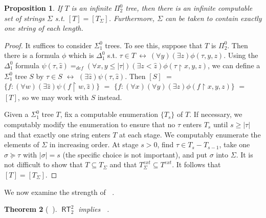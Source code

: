 \documentclass{amsart}
\theoremstyle{plain}
\newtheorem{theorem}{Theorem}
\newtheorem{prop}[theorem]{Proposition}
\theoremstyle{remark}
\theoremstyle{definition}
\DeclareMathOperator{\RCA}{\mathsf{RCA}_0}
\DeclareMathOperator{\RT}{\mathsf{RT}}
\DeclareMathOperator{\RKLp}{\mathsf{RKL}^{(1)}}
\begin{document}
\begin{prop}
\label{lemma.pi2-trees}
If $T$ is an infinite $\Pi^0_2$ tree, then there is an infinite computable set of strings $\Sigma$ s.t. $[T]=[T_{\Sigma}]$. 
Furthermore, $\Sigma$ can be taken to contain exactly one string of each length.
\end{prop}
\begin{proof}
It suffices to consider $\Sigma^0_1$ trees.
To see this, suppose that $T$ is $\Pi^0_2$.  Then there is a formula $\phi$ which is $\Delta^0_1$ s.t. $\tau\in T\ \leftrightarrow\ (\forall y)(\exists z)\phi(\tau,y,z)$.
	Using the $\Delta^0_1$ formula $\psi(\tau, \hat{z}) =_{def} (\forall x,y\leq |\tau|)(\exists z<\hat{z})\phi(\tau\upharpoonright x,y,z)$, 
we can define a $\Sigma^0_1$ tree $S$ by $\tau\in S$ $\leftrightarrow$ $(\exists \hat{z}) \psi(\tau,\hat{z})$.
Then $[S]$ $=$ $\{f: (\forall w)(\exists \hat{z})\psi(f\upharpoonright w,\hat{z}) \}$ 
$=$ $\{f: (\forall x)(\forall y)(\exists z)\phi(f\upharpoonright x,y,z) \}$
$=$ $[T]$, so we may work with $S$ instead.

Given a $\Sigma^0_1$ tree $T$, fix a computable enumeration $\{T_s\}$ of $T$.  
If necessary, we computably modify the enumeration to ensure that 
	no $\tau$ enters $T_s$ until $s\geq |\tau|$ and that
	exactly one string enters $T$ at each stage.
We computably enumerate the elements of $\Sigma$ in increasing order. 
At stage $s>0$, find $\tau\in T_s-T_{s-1}$, take one $\sigma\succeq\tau$ with $|\sigma|=s$ 
	(the specific choice is not important), and put $\sigma$ into $\Sigma$.
It is not difficult to show that $T\subseteq T_{\Sigma}$ and that $T_{\Sigma}^{ext}\subseteq T^{ext}$.  It follows that $[T]=[T_{\Sigma}]$. 
\end{proof}

We now examine the strength of $\RKLp$.

\begin{theorem}[$\RCA$]
\label{thm.rt-implies-RKLp}
$\RT^2_2$ implies $\RKLp$.
\end{theorem}
\end{document}
